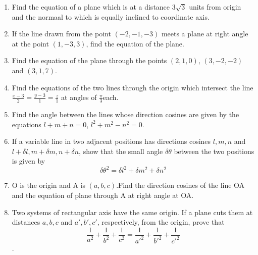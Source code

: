 \documentclass[12pt]{article}
\begin{document}
\begin{enumerate}
\item Find the equation of a plane which is at a distance 3$\sqrt{3}$ units from origin and the normaal to which is equally inclined to coordinate axis.
\item If the line drawn from the point $(-2,-1,-3)$ meets a plane at right angle at the point $(1,-3,3)$, find the equation of the plane.
\item Find the equation of the plane through the points $(2,1,0)$, $(3,-2,-2)$ and $(3,1,7)$.
\item Find the equations of the two lines through the origin which intersect the line \(\displaystyle \frac{x-3}{2}=\frac{y-3}{1}=\frac{z}{1}\) at angles of \(\displaystyle \frac{\pi}{3}\)each.
\item Find the angle between the lines whose direction cosines are given by the equations $l+m+n=0$, $l^2+m^2-n^2=0$.
\item If a variable line in two adjacent positions has directions cosines $l, m, n$ and $l+\delta l, m+\delta m, n+\delta n$, show that the small angle $\delta\theta$ between the two positions is given by $$\delta\theta^2=\delta l^2+\delta m^2+\delta n^2$$ 
\item O is the origin and A is $(a,b,c)$.Find the direction cosines of the line OA and the equation of plane through A at right angle at OA.
\item Two systems of rectangular axis have the same origin. If a plane cuts them at distances $a,b,c$ and $a',b',c'$, respectively, from the origin, prove that $$\frac{1}{a^2}+\frac{1}{b^2}+\frac{1}{c^2}=\frac{1}{a'^2}+\frac{1}{b'^2}+\frac{1}{c'^2}$$.

\end{enumerate}
\end{document}
